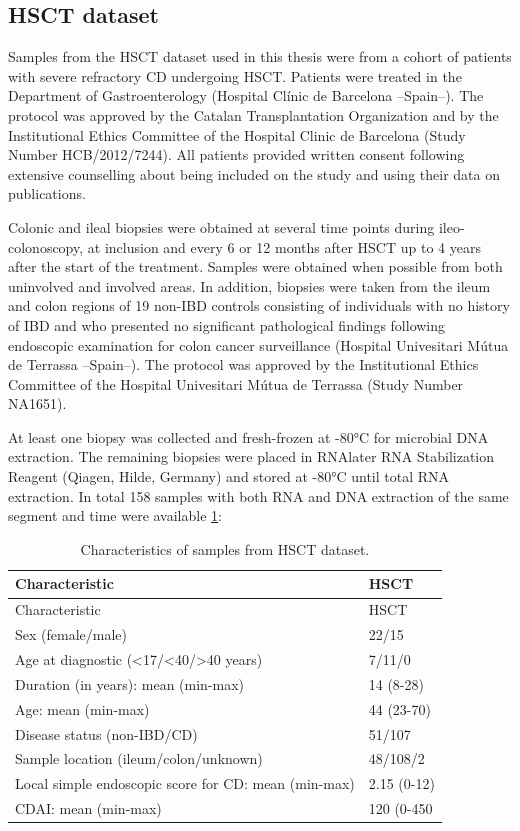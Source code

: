 \documentclass[
  a4paper,
]{book}
\begin{document}
\hypertarget{methods-hsct}{%
\subsection{HSCT dataset}\label{methods-hsct}}

Samples from the HSCT dataset used in this thesis were from a cohort of patients with severe refractory CD undergoing HSCT.
Patients were treated in the Department of Gastroenterology (Hospital Clínic de Barcelona --Spain--).
The protocol was approved by the Catalan Transplantation Organization and by the Institutional Ethics Committee of the Hospital Clinic de Barcelona (Study Number HCB/2012/7244).
All patients provided written consent following extensive counselling about being included on the study and using their data on publications.

Colonic and ileal biopsies were obtained at several time points during ileo-colonoscopy, at inclusion and every 6 or 12 months after HSCT up to 4 years after the start of the treatment.
Samples were obtained when possible from both uninvolved and involved areas.
In addition, biopsies were taken from the ileum and colon regions of 19 non-IBD controls consisting of individuals with no history of IBD and who presented no significant pathological findings following endoscopic examination for colon cancer surveillance (Hospital Univesitari Mútua de Terrassa --Spain--).
The protocol was approved by the Institutional Ethics Committee of the Hospital Univesitari Mútua de Terrassa (Study Number NA1651).

At least one biopsy was collected and fresh-frozen at -80°C for microbial DNA extraction.
The remaining biopsies were placed in RNAlater RNA Stabilization Reagent (Qiagen, Hilde, Germany) and stored at -80°C until total RNA extraction.
In total 158 samples with both RNA and DNA extraction of the same segment and time were available \ref{tab:HSCT}:

\begin{longtable}[]{@{}ll@{}}
\caption{\label{tab:HSCT} Characteristics of samples from HSCT dataset.}\tabularnewline
\toprule
Characteristic & HSCT \\
\midrule
\endfirsthead
\toprule
Characteristic & HSCT \\
\midrule
\endhead
Sex (female/male) & 22/15 \\
Age at diagnostic (\textless17/\textless40/\textgreater40 years) & 7/11/0 \\
Duration (in years): mean (min-max) & 14 (8-28) \\
Age: mean (min-max) & 44 (23-70) \\
Disease status (non-IBD/CD) & 51/107 \\
Sample location (ileum/colon/unknown) & 48/108/2 \\
Local simple endoscopic score for CD: mean (min-max) & 2.15 (0-12) \\
CDAI: mean (min-max) & 120 (0-450 \\
\bottomrule
\end{longtable}
\end{document}
